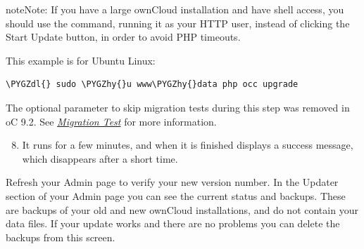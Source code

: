 \documentclass[letterpaper,10pt,english]{sphinxmanual}
\def\PYGZdl{\char`\$}
\def\PYGZhy{\char`\-}
\begin{document}
\begin{figure}[htbp]
\centering

\end{figure}

\begin{notice}{note}{Note:}
If you have a large ownCloud installation and have shell access,
you should use the  command, running it as your HTTP user,
instead of clicking the Start Update button, in order to avoid PHP
timeouts.
\end{notice}

This example is for Ubuntu Linux:

\begin{Verbatim}[commandchars=\\\{\}]
\PYGZdl{} sudo \PYGZhy{}u www\PYGZhy{}data php occ upgrade
\end{Verbatim}

The optional parameter to skip migration tests during this step was removed in oC 9.2.
See {\hyperref[maintenance/upgrade:migration-test-label]{\emph{Migration Test}}} for more information.
\begin{enumerate}
\setcounter{enumi}{7}
\item {} 
It runs for a few minutes, and when it is finished displays a success
message, which disappears after a short time.

\end{enumerate}

Refresh your Admin page to verify your new version number. In the Updater
section of your Admin page you can see the current status and backups. These
are backups of your old and new ownCloud installations, and do not contain your
data files. If your update works and there are no problems you can delete the
backups from this screen.
\end{document}
